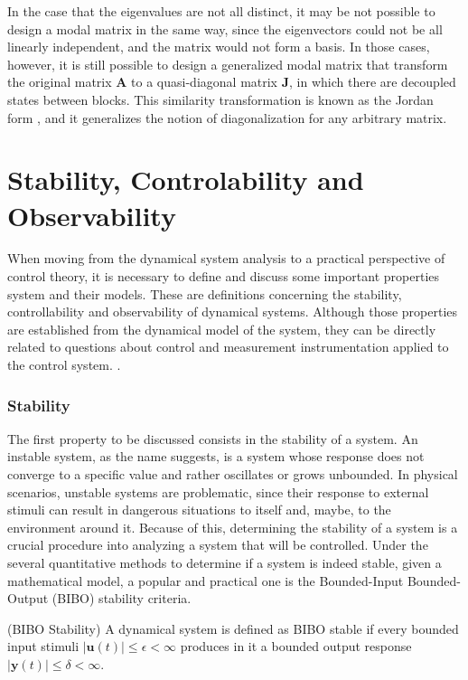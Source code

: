 \documentclass[a4paper,11pt]{book}
\numberwithin{figure}{chapter}
\numberwithin{equation}{chapter}
\numberwithin{table}{chapter}
\theoremstyle{definition}
\newtheorem{definition}{Definition}[chapter]
\newcounter{boxed-theorem}
\newcounter{boxed-lemma}
\newcounter{boxed-definition}
\newenvironment{boxed-definition}[1]
{\colorlet{shadecolor}{pastelYellow!15} \begin{shaded} \begin{definition}{#1}}
{\end{definition} \end{shaded}}
\newcounter{boxed-example}
\begin{document}
In the case that the eigenvalues are not all distinct, it may be not possible to design a modal matrix in the same way, since the eigenvectors could not be all linearly independent, and the matrix would not form a basis. In those cases, however, it is still possible to design a generalized modal matrix that transform the original matrix $\bm{A}$ to a quasi-diagonal matrix $\bm{J}$, in which there are decoupled states between blocks. This similarity transformation is known as the Jordan form \cite{Strang:2016}, and it generalizes the notion of diagonalization for any arbitrary matrix.

\section{Stability, Controlability and Observability}

When moving from the dynamical system analysis to a practical perspective of control theory, it is necessary to define and discuss some important properties system and their models. These are definitions concerning the stability, controllability and observability of dynamical systems. Although those properties are established from the dynamical model of the system, they can be directly related to questions about control and measurement instrumentation applied to the control system. .

\subsubsection{Stability}

The first property to be discussed consists in the stability of a system. An instable system, as the name suggests, is a system whose response does not converge to a specific value and rather oscillates or grows unbounded. In physical scenarios, unstable systems are problematic, since their response to external stimuli can result in dangerous situations to itself and, maybe, to the environment around it. Because of this, determining the stability of a system is a crucial procedure into analyzing a system that will be controlled. Under the several quantitative methods to determine if a system is indeed stable, given a mathematical model, a popular and practical one is the Bounded-Input Bounded-Output (BIBO) stability criteria.

\begin{boxed-definition}{(BIBO Stability)} \label{def:BIBOStab}
    A dynamical system is defined as BIBO stable if every bounded input stimuli $| \bm{u}(t) | \leq \epsilon < \infty$ produces in it a bounded output response $| \bm{y}(t) | \leq \delta < \infty$.
\end{boxed-definition}
\end{document}
